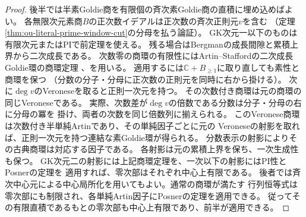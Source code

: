 \documentclass[11pt,a4paper]{ltjsarticle}
\theoremstyle{definition}
\begin{document}
\begin{proof}
後半では半素Goldie商を有限個の斉次素Goldie商の直積に埋め込めばよい。
各無限次元素商$B$の正次数イデアルは正次数の斉次正則元$v$を含む
（定理\ref{thm:ou-literal-prime-window-cut}の分母を払う論証）。
GK次元一以下のものは有限次元またはPIで前定理を使える。
残る場合はBergmanの成長間隙と累積上界から二次成長である。
次数零の商環の有限性にはArtin--Staffordの二次成長Goldie環の商環定理
\cite{ASsemiprime2000}、\cite[\S6]{StaffordVdB2001}を用いる。
適用するには$\mathbb C+B_{\ge1}$に取り直しても素性と商環を保つ
（分数の分子・分母に正次数の正則元を同時に右から掛ける）。
次に$\deg v$のVeroneseを取ると正則一次元を持つ。
その次数付き商環は元の商環の同じVeroneseである。
実際、次数差が$\deg v$の倍数である分数は分子・分母の右に分母の冪を
掛け、両者の次数を同じ倍数列に揃えられる。
このVeronese商環は次数付き半単純Artinであり、その単純因子ごとに元の
Veroneseの射影を取れば、正則一次元を持つ連結な素Goldie環が得られる。
分数表示の射影によりその古典商環は対応する因子である。
各射影は元の累積上界を保ち、一次生成性も保つ。
GK次元二の射影には上記商環定理を、一次以下の射影にはPI性とPosnerの定理を
適用すれば、零次部はそれぞれ中心上有限である。
後者では斉次中心元による中心局所化を用いてもよい。通常の商環が満たす
行列恒等式は零次部にも制限され、各単純Artin因子にPosnerの定理を適用できる。
従ってその有限直積であるもとの零次部も中心上有限であり、前半が適用できる。
\end{proof}
\end{document}
